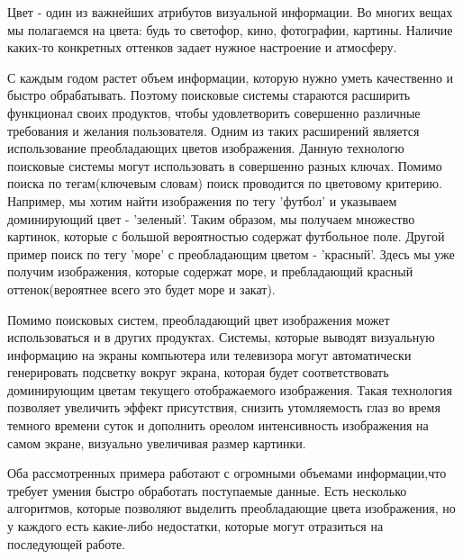\Introduction

Цвет - один из важнейших атрибутов визуальной информации. Во многих вещах мы полагаемся на цвета: будь то светофор, кино, фотографии, картины. Наличие каких-то конкретных оттенков задает нужное настроение и атмосферу. 

С каждым годом растет объем информации, которую нужно уметь качественно и быстро обрабатывать. Поэтому поисковые системы стараются расширить функционал своих продуктов, чтобы удовлетворить совершенно различные требования и желания пользователя. Одним из таких расширений является использование преобладающих цветов изображения. Данную технологю поисковые системы могут использовать в совершенно разных ключах. Помимо поиска по тегам(ключевым словам) поиск проводится по цветовому критерию. Например, мы хотим найти изображения по тегу 'футбол' и указываем доминирующий цвет - 'зеленый'. Таким образом, мы получаем множество картинок, которые с большой вероятностью содержат футбольное поле. Другой пример поиск  по тегу 'море' с преобладающим цветом - 'красный'. Здесь мы уже получим изображения, которые содержат море, и пребладающий красный оттенок(вероятнее всего это будет море и закат). 

Помимо поисковых систем, преобладающий цвет изображения может использоваться и в других продуктах. Системы, которые выводят визуальную информацию на экраны компьютера или телевизора могут автоматически генерировать подсветку вокруг экрана, которая будет соответствовать доминирующим цветам текущего отображаемого изображения. Такая технология позволяет увеличить эффект присутствия, снизить утомляемость глаз во время темного времени суток и дополнить ореолом интенсивность изображения на самом экране, визуально увеличивая размер картинки.

Оба рассмотренных примера работают с огромными объемами информации,что требует умения быстро обработать поступаемые данные. Есть несколько алгоритмов, которые позволяют выделить преобладающие цвета изображения, но у каждого есть какие-либо недостатки, которые могут отразиться на последующей работе.
